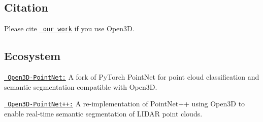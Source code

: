 \subsection*{Citation}

Please cite \href{https://arxiv.org/abs/1801.09847}{\texttt{ our work}} if you use Open3D.


\begin{DoxyCode}{0}
\DoxyCodeLine{\}}
\end{DoxyCode}


\subsection*{Ecosystem}


\begin{DoxyItemize}
\item \href{https://github.com/intel-isl/Open3D-PointNet}{\texttt{ Open3\+D-\/\+Point\+Net\+:}} A fork of Py\+Torch Point\+Net for point cloud classification and semantic segmentation compatible with Open3D.
\item \href{https://github.com/intel-isl/Open3D-PointNet2-Semantic3D}{\texttt{ Open3\+D-\/\+Point\+Net++\+:}} A re-\/implementation of Point\+Net++ using Open3D to enable real-\/time semantic segmentation of L\+I\+D\+AR point clouds. 
\end{DoxyItemize}